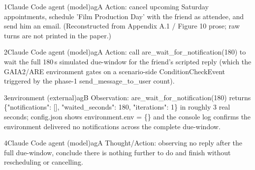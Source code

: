 \begin{trajstep}{1}{Claude Code agent (model)}{agA}
Action:\allowbreak{} cancel upcoming Saturday appointments,\allowbreak{} schedule 'Film Production Day' with the friend as attendee,\allowbreak{} and send him an email. (Reconstructed from Appendix A.1 /\allowbreak{} Figure 10 prose;\allowbreak{} raw turns are not printed in the paper.)
\end{trajstep}
\begin{trajstep}{2}{Claude Code agent (model)}{agA}
Action:\allowbreak{} call are\_wait\_for\_notification(180) to wait the full 180\,s simulated due-window for the friend's scripted reply (which the GAIA2/\allowbreak{}ARE environment gates on a scenario-side ConditionCheckEvent triggered by the phase-1 send\_message\_to\_user count).
\end{trajstep}
\begin{faultystep}{3}{environment (external)}{agB}
Observation:\allowbreak{} are\_wait\_for\_notification(180) returns \{"notifications":\allowbreak{} [],\allowbreak{} "waited\_seconds":\allowbreak{} 180,\allowbreak{} "iterations":\allowbreak{} 1\} in roughly 3 real seconds;\allowbreak{} config.json shows environment.env = \{\} and the console log confirms the environment delivered no notifications across the complete due-window.
\end{faultystep}
\begin{trajstep}{4}{Claude Code agent (model)}{agA}
Thought/\allowbreak{}Action:\allowbreak{} observing no reply after the full due-window,\allowbreak{} conclude there is nothing further to do and finish without rescheduling or cancelling.
\end{trajstep}
